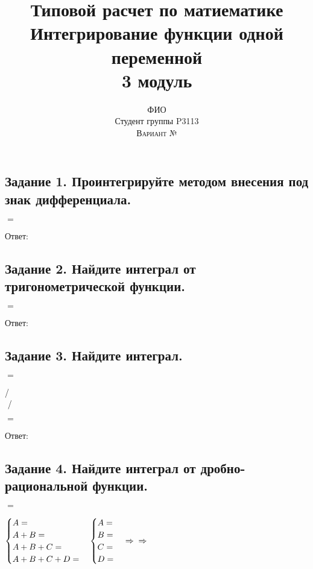 \documentclass[12pt]{article}
\title{Типовой расчет по матиематике\\Интегрирование функции одной переменной\\3 модуль}
\author{ФИО\\
Студент группы P3113\\
\textsc{Вариант №}}
\begin{document}
\setlength{\droptitle}{-5em}    

\maketitle

\subsection*{Задание 1. Проинтегрируйте методом внесения под знак дифференциала.}

$=$\vspace{2.5mm}

Ответ: $ $

\subsection*{Задание 2. Найдите интеграл от тригонометрической функции.}

$=$\vspace{2.5mm}

Ответ: $ $

\subsection*{Задание 3. Найдите интеграл.}

$=$\vspace{2.5mm}

/ $ $ \\
$ $ /

$=$\vspace{2.5mm}

Ответ: $ $

\subsection*{Задание 4. Найдите интеграл от дробно-рациональной функции.}

$=$\vspace{2.5mm}

$
\begin{cases}
A=\\
A+B=\\
A+B+C=\\
A+B+C+D=
\end{cases} \begin{cases}
A=\\
B=\\
C=\\
D=
\end{cases}\Rightarrow\vspace{2.5mm} \\
\Rightarrow $\vspace{2.5mm}
\end{document}
